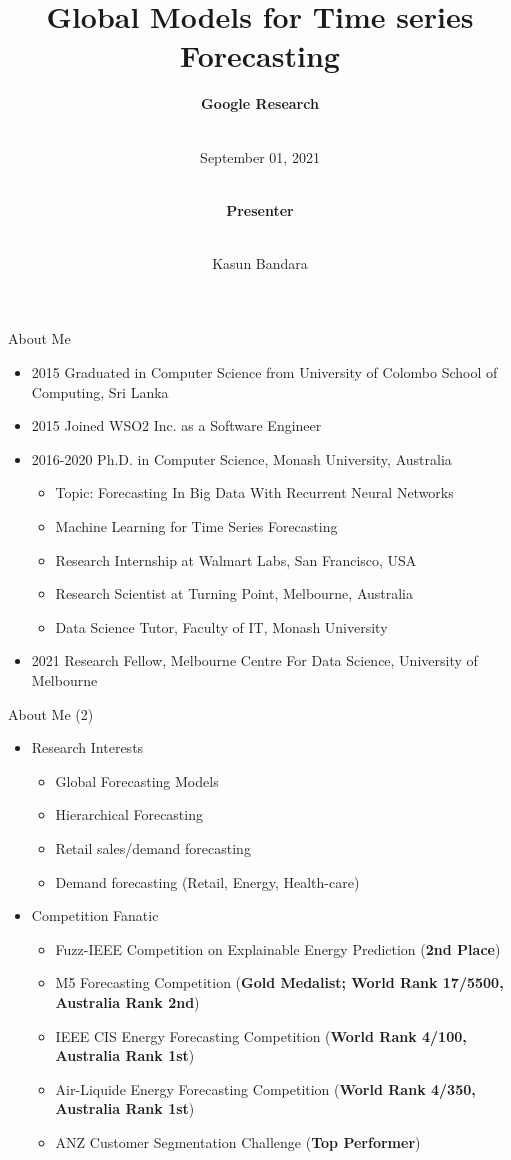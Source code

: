 \documentclass{beamer}
\title[Global Forecasting Models]{Global Models for Time series Forecasting}
\author[Kasun Bandara]{\textbf{Google Research} \and \\\vspace{2mm} \scriptsize September 01, 2021
\and \\\vspace{3mm} \textbf{\scriptsize Presenter} \and \\\vspace{2mm} Kasun Bandara
}
\institute{School of Computing and Information Systems \\\vspace{1mm} Melbourne Centre For Data Science \\\vspace{1mm} University of Melbourne}
\date[September 01, 2021]{}
\begin{document}
\begin{frame}[plain]
  \titlepage
\end{frame}

\begin{frame}{About Me}
\begin{itemize}
\item 2015 Graduated in Computer Science from University of Colombo School of Computing, Sri Lanka
\item 2015 Joined WSO2 Inc. as a Software Engineer
\item 2016-2020 Ph.D. in Computer Science, Monash University, Australia
 \begin{itemize}
  \item Topic: Forecasting In Big Data With Recurrent Neural Networks
  \item Machine Learning for Time Series Forecasting
  \item Research Internship at Walmart Labs, San Francisco, USA
  \item Research Scientist at Turning Point, Melbourne, Australia
  \item Data Science Tutor, Faculty of IT, Monash University
 \end{itemize}
\item 2021 Research Fellow, Melbourne Centre For Data Science, University of Melbourne
\end{itemize}
\end{frame}

\begin{frame}{About Me (2)}
\begin{itemize}
\item Research Interests
\begin{itemize}
 \item Global Forecasting Models
  \item Hierarchical Forecasting
  \item Retail sales/demand forecasting
  \item Demand forecasting (Retail, Energy, Health-care)
  \end{itemize}
\item Competition Fanatic
  \begin{itemize}
  \item Fuzz-IEEE Competition on Explainable Energy Prediction (\textbf{2nd Place})
  \item M5 Forecasting Competition (\textbf{Gold Medalist; World Rank 17/5500, Australia Rank 2nd})
  \item IEEE CIS Energy Forecasting Competition (\textbf{World Rank 4/100, Australia Rank 1st})
  \item Air-Liquide Energy Forecasting Competition (\textbf{World Rank 4/350, Australia Rank 1st})
  \item ANZ Customer Segmentation Challenge (\textbf{Top Performer})
  \end{itemize}
\end{itemize}
\end{frame}
\end{document}
